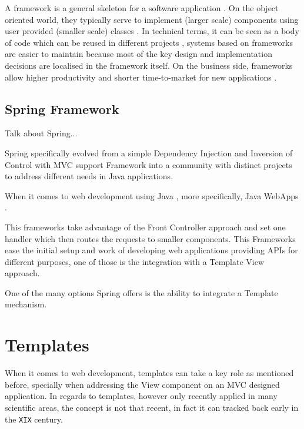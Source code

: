 A framework is a general skeleton for a software application \cite{smaltalk}. On the object oriented world, they typically serve to implement (larger scale) components using user provided (smaller scale) classes \cite{thesis}. In technical terms, it can be seen as a body of code which can be reused in different projects \cite{smaltalk}, systems based on frameworks are easier to maintain because most of the key design and implementation decisions are localised in the framework itself.  On the business side, frameworks allow higher productivity and shorter time-to-market for new applications \cite{thesis}.

\subsection{Spring Framework}

\begin{expand}
    Talk about Spring...\cite{Johnson2005ProfessionalFramework}
    
    Spring specifically evolved from a simple Dependency Injection and Inversion of Control with MVC support Framework into a community with distinct projects to address different needs in Java applications.
\end{expand}

When it comes to web development using Java \cite{Bloch2008EffectiveSeries}, more specifically, Java WebApps \cite{Williams2014ProfessionalApplications}.

This frameworks take advantage of the Front Controller approach and set one handler which then routes the requests to smaller components. This Frameworks ease the initial setup and work of developing web applications providing APIs for different purposes, one of those is the integration with a Template View approach.

One of the many options Spring offers is the ability to integrate a Template mechanism.

\section{Templates}

When it comes to web development, templates can take a key role as mentioned before, specially when addressing the View component on an MVC designed application. In regards to templates, however only recently applied in many scientific areas, the concept is not that recent, in fact it can tracked back early in the \texttt{XIX} century.

